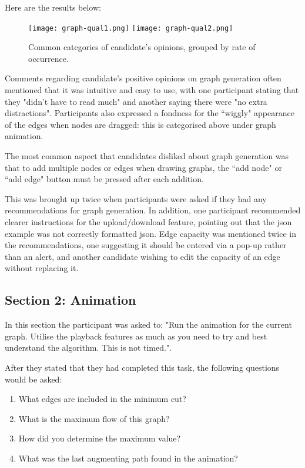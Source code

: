 \documentclass{l4proj}
\begin{document}
Here are the results below:
\begin{figure}[h]
    \centering
    \texttt{[image: graph-qual1.png]}
    \texttt{[image: graph-qual2.png]}
    \caption{Common categories of candidate's opinions, grouped by rate of occurrence.}
    \label{fig:my_label}
\end{figure}

Comments regarding candidate's positive opinions on graph generation often mentioned that it was intuitive and easy to use, with one participant stating that they "didn't have to read much" and another saying there were "no extra distractions". Participants also expressed a fondness for the ``wiggly" appearance of the edges when nodes are dragged: this is categorised above under graph animation.

The most common aspect that candidates disliked about graph generation was that to add multiple nodes or edges when drawing graphs, the ``add node" or ``add edge" button must be pressed after each addition.

This was brought up twice when participants were asked if they had any recommendations for graph generation. In addition, one participant recommended clearer instructions for the upload/download feature, pointing out that the json example was not correctly formatted json. Edge capacity was mentioned twice in the recommendations, one suggesting it should be entered via a pop-up rather than an alert, and another candidate wishing to edit the capacity of an edge without replacing it.

\subsection{Section 2: Animation}
In this section the participant was asked to: "Run the animation for the current graph. Utilise the playback features as much as you need to try and best understand the algorithm. This is not timed.".

After they stated that they had completed this task, the following questions would be asked:

\begin{enumerate}[noitemsep]
    \item What edges are included in the minimum cut?
    \item What is the maximum flow of this graph?
    \item How did you determine the maximum value?
    \item What was the last augmenting path found in the animation?
\end{enumerate}
\end{document}
